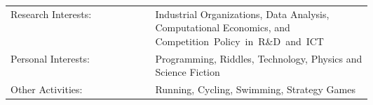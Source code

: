 \documentclass[a4paper,9pt]{article}
\begin{document}
\begin{tabular}{lp{0.6\linewidth}}
	Research Interests: & Industrial Organizations, Data Analysis, Computational Economics, and \mbox{Competition Policy in R\&D and ICT}\\
	Personal Interests: & Programming, Riddles, Technology, Physics and Science Fiction\\
	Other Activities:   & Running, Cycling, Swimming, Strategy Games
\end{tabular}


%
%
\end{document}
